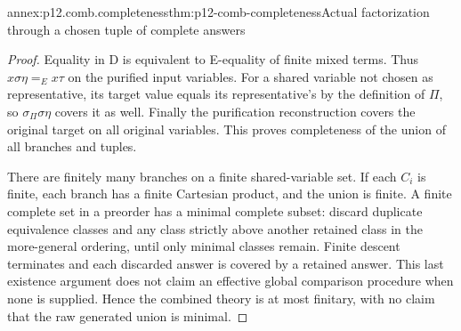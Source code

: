 \begin{annexitem}{annex:p12.comb.completeness}{thm:p12-comb-completeness}{Actual factorization through a chosen tuple of complete answers}
\begin{proof}
Equality in D is equivalent to E-equality of finite mixed terms.
Thus \(x\sigma\eta=_Ex\tau\) on the purified input variables.
For a shared variable not chosen as representative, its target
value equals its representative's by the definition of \(\Pi\),
so \(\sigma_\Pi\sigma\eta\) covers it as well. Finally the
purification reconstruction covers the original target on all
original variables. This proves completeness of the union of all
branches and tuples.

There are finitely many branches on a finite shared-variable set.
If each \(C_i\) is finite, each branch has a finite Cartesian product,
and the union is finite. A finite complete set in a preorder has
a minimal complete subset: discard duplicate equivalence classes
and any class strictly above another retained class in the
more-general ordering, until only minimal classes remain.
Finite descent terminates and each discarded answer is covered
by a retained answer. This last existence argument does not
claim an effective global comparison procedure when none is supplied.
Hence the combined theory is at most finitary, with no claim that
the raw generated union is minimal.
\end{proof}
\end{annexitem}

